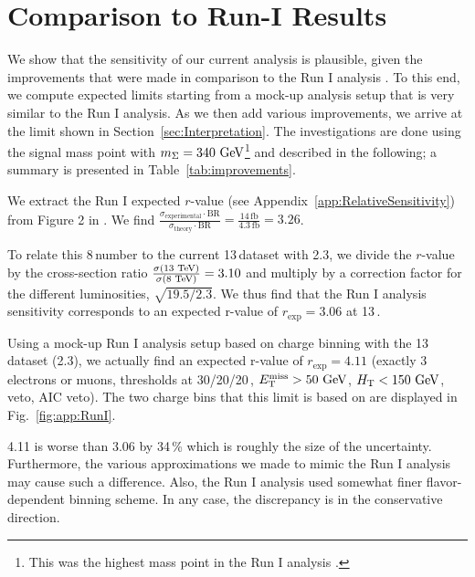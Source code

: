 \chapter{Comparison to Run-I Results}
We show that the sensitivity of our current analysis is plausible, given the improvements that were made in comparison to the Run I analysis \cite{CMS-PAS-EXO-14-001}. To this end, we compute expected limits starting from a mock-up analysis setup that is very similar to the Run I analysis. As we then add various improvements, we arrive at the limit shown in Section~\ref{sec:Interpretation}. The investigations are done using the signal mass point with $m_\Sigma = 340\,\,\text{Ge\hspace{-.08em}V}$\footnote{This was the highest mass point in the Run I analysis \cite{CMS-PAS-EXO-14-001}.} and described in the following; a summary is presented in Table~\ref{tab:improvements}.

We extract the Run I expected $r$-value (see Appendix~\ref{app:RelativeSensitivity}) from Figure 2 in \cite{CMS-PAS-EXO-14-001}. We find $\frac{\sigma_\textrm{experimental} \cdot \textrm{BR}}{\sigma_\textrm{theory} \cdot \textrm{BR}} = \frac{14\,\textrm{fb}}{4.3\,\textrm{fb}} = 3.26$.

To relate this 8\,\TeV number to the current 13\,\TeV dataset with 2.3\fbinv, we divide the $r$-value by the cross-section ratio $\frac{\sigma(13\,\,\text{Te\hspace{-.08em}V})}{\sigma(8\,\,\text{Te\hspace{-.08em}V})} = 3.10$ and multiply by a correction factor for the different luminosities, $\sqrt{19.5/2.3}$. We thus find that the Run I analysis sensitivity corresponds to an expected r-value of $r_\textrm{exp} = 3.06$ at 13\,\TeV.

Using a mock-up Run I analysis setup based on charge binning with the 13\,\TeV dataset (2.3\fbinv), we actually find an expected r-value of $r_\textrm{exp} = 4.11$ (exactly 3 electrons or muons, \pt thresholds at 30/20/20\,\GeV, $E_{\mathrm{T}}^{\text{miss}} > 50\,\,\text{Ge\hspace{-.08em}V}$, $H_{\mathrm{T}} < 150\,\,\text{Ge\hspace{-.08em}V}$, \Z veto, AIC veto). The two charge bins that this limit is based on are displayed in Fig.~\ref{fig:app:RunI}.

4.11 is worse than 3.06 by 34\,\% which is roughly the size of the uncertainty. Furthermore, the various approximations we made to mimic the Run I analysis may cause such a difference. Also, the Run I analysis used somewhat finer flavor-dependent binning scheme. In any case, the discrepancy is in the conservative direction.

